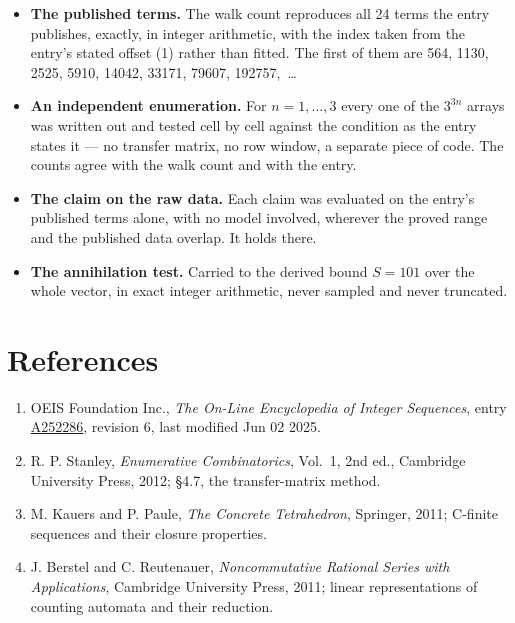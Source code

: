 \documentclass[11pt]{article}
\theoremstyle{definition}
\begin{document}
\begin{itemize}

\item {\bfseries The published terms.} The walk count reproduces all 24 terms the entry publishes, exactly, in integer arithmetic, with the index taken from the entry's stated offset (1) rather than fitted. The first of them are 564, 1130, 2525, 5910, 14042, 33171, 79607, 192757,~\dots

\item {\bfseries An independent enumeration.} For $n = 1,\dots,3$ every one of the $3^{3n}$ arrays was written out and tested cell by cell against the condition as the entry states it --- no transfer matrix, no row window, a separate piece of code. The counts agree with the walk count and with the entry.

\item {\bfseries The claim on the raw data.} Each claim was evaluated on the entry's published terms alone, with no model involved, wherever the proved range and the published data overlap. It holds there.

\item {\bfseries The annihilation test.} Carried to the derived bound $S = 101$ over the whole vector, in exact integer arithmetic, never sampled and never truncated.

\end{itemize}

\section{References}

\begin{enumerate}

\item OEIS Foundation Inc., \emph{The On-Line Encyclopedia of Integer Sequences}, entry \href{https://oeis.org/A252286}{A252286}, revision 6, last modified Jun 02 2025.

\item R. P. Stanley, \emph{Enumerative Combinatorics}, Vol.~1, 2nd ed., Cambridge University Press, 2012; \S4.7, the transfer-matrix method.

\item M. Kauers and P. Paule, \emph{The Concrete Tetrahedron}, Springer, 2011; C-finite sequences and their closure properties.

\item J. Berstel and C. Reutenauer, \emph{Noncommutative Rational Series with Applications}, Cambridge University Press, 2011; linear representations of counting automata and their reduction.

\end{enumerate}
\end{document}

